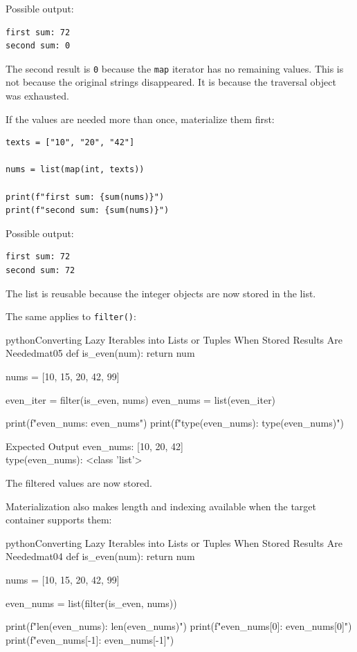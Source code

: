 Possible output:

\begin{verbatim}
first sum: 72
second sum: 0
\end{verbatim}

The second result is \texttt{0} because the \texttt{map} iterator has no remaining values. This is not because the original strings disappeared. It is because the traversal object was exhausted.

If the values are needed more than once, materialize them first:

\begin{verbatim}
texts = ["10", "20", "42"]

nums = list(map(int, texts))

print(f"first sum: {sum(nums)}")
print(f"second sum: {sum(nums)}")
\end{verbatim}

Possible output:

\begin{verbatim}
first sum: 72
second sum: 72
\end{verbatim}

The list is reusable because the integer objects are now stored in the list.

The same applies to \texttt{filter()}:

\begin{codebox}[]{python}{Converting Lazy Iterables into Lists or Tuples When Stored Results Are Needed}{mat05}
def is_even(num):
    return num %

nums = [10, 15, 20, 42, 99]

even_iter = filter(is_even, nums)
even_nums = list(even_iter)

print(f"even_nums: {even_nums}")
print(f"type(even_nums): {type(even_nums)}")
\end{codebox}


\begin{iobox}{Expected Output}
even\_nums: [10, 20, 42] \\
type(even\_nums): <class 'list'> \\
\end{iobox}




The filtered values are now stored.

Materialization also makes length and indexing available when the target container supports them:

\begin{codebox}[]{python}{Converting Lazy Iterables into Lists or Tuples When Stored Results Are Needed}{mat04}
def is_even(num):
    return num %

nums = [10, 15, 20, 42, 99]

even_nums = list(filter(is_even, nums))

print(f"len(even_nums): {len(even_nums)}")
print(f"even_nums[0]: {even_nums[0]}")
print(f"even_nums[-1]: {even_nums[-1]}")
\end{codebox}


